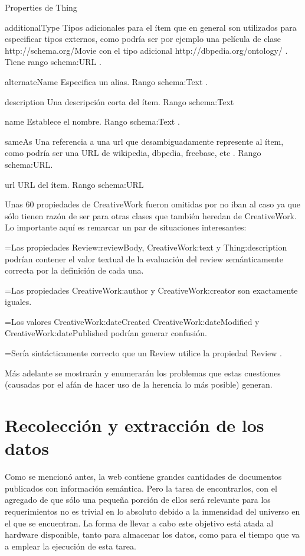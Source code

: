 Properties de Thing

additionalType 	 Tipos adicionales para el ítem que en general son utilizados para especificar tipos externos, como podría ser por ejemplo una película de clase http://schema.org/Movie con el tipo adicional  http://dbpedia.org/ontology/ . Tiene rango schema:URL .

alternateName 	 Especifica un alias. Rango schema:Text .

description 	Una descripción corta del ítem. Rango schema:Text 

name 		Establece el nombre. Rango schema:Text .

sameAs 		Una referencia a una url que desambiguadamente represente al ítem, como podría ser una URL de wikipedia, dbpedia, freebase, etc . Rango schema:URL.

url 		URL del ítem. Rango schema:URL

Unas 60 propiedades de CreativeWork fueron omitidas por no iban al caso ya que sólo tienen razón de ser para otras clases que 
también heredan de CreativeWork. Lo importante aquí es remarcar un par de situaciones interesantes:

=Las propiedades Review:reviewBody, CreativeWork:text y Thing:description podrían contener el valor textual de la evaluación del review semánticamente correcta por la definición de cada una.

=Las propiedades CreativeWork:author y CreativeWork:creator son exactamente iguales. 

=Los valores CreativeWork:dateCreated CreativeWork:dateModified y CreativeWork:datePublished podrían generar confusión. 

=Sería sintácticamente correcto que un Review utilice la propiedad Review .

Más adelante se mostrarán y enumerarán los problemas que estas cuestiones (causadas por el afán de hacer uso de la herencia
lo más posible)  generan. 


\section{Recolección y extracción de los datos}

%
Como se mencionó antes, la web contiene grandes cantidades de documentos publicados con información semántica. Pero la tarea
de encontrarlos, con el agregado de que sólo una pequeña porción de ellos será relevante para los requerimientos no es trivial
en lo absoluto debido a la inmensidad del universo en el que se encuentran. La forma de llevar a cabo este objetivo está 
atada al hardware disponible, tanto para almacenar los datos, como para el tiempo que va a emplear la ejecución de esta 
tarea.  

